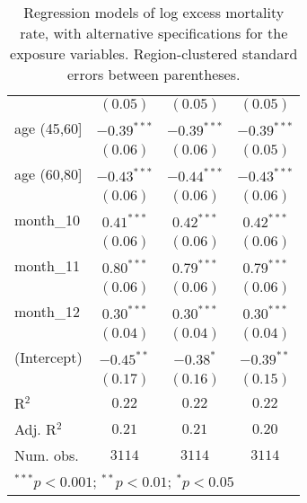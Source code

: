 \begin{table}
\begin{center}
\begin{tabular}{l c c c}
                    & $(0.05)$      & $(0.05)$      & $(0.05)$      \\
age (45,60]         & $-0.39^{***}$ & $-0.39^{***}$ & $-0.39^{***}$ \\
                    & $(0.06)$      & $(0.06)$      & $(0.05)$      \\
age (60,80]         & $-0.43^{***}$ & $-0.44^{***}$ & $-0.43^{***}$ \\
                    & $(0.06)$      & $(0.06)$      & $(0.06)$      \\
month\_10           & $0.41^{***}$  & $0.42^{***}$  & $0.42^{***}$  \\
                    & $(0.06)$      & $(0.06)$      & $(0.06)$      \\
month\_11           & $0.80^{***}$  & $0.79^{***}$  & $0.79^{***}$  \\
                    & $(0.06)$      & $(0.06)$      & $(0.06)$      \\
month\_12           & $0.30^{***}$  & $0.30^{***}$  & $0.30^{***}$  \\
                    & $(0.04)$      & $(0.04)$      & $(0.04)$      \\
(Intercept)         & $-0.45^{**}$  & $-0.38^{*}$   & $-0.39^{**}$  \\
                    & $(0.17)$      & $(0.16)$      & $(0.15)$      \\
\hline
R$^2$               & $0.22$        & $0.22$        & $0.22$        \\
Adj. R$^2$          & $0.21$        & $0.21$        & $0.20$        \\
Num. obs.           & $3114$        & $3114$        & $3114$        \\
\hline
\multicolumn{4}{l}{\scriptsize{$^{***}p<0.001$; $^{**}p<0.01$; $^{*}p<0.05$}}
\end{tabular}
\caption{Regression models of log excess mortality rate, with alternative specifications for the exposure variables. Region-clustered standard errors between parentheses.}
\label{tab:altspecmodels}
\end{center}
\end{table}
